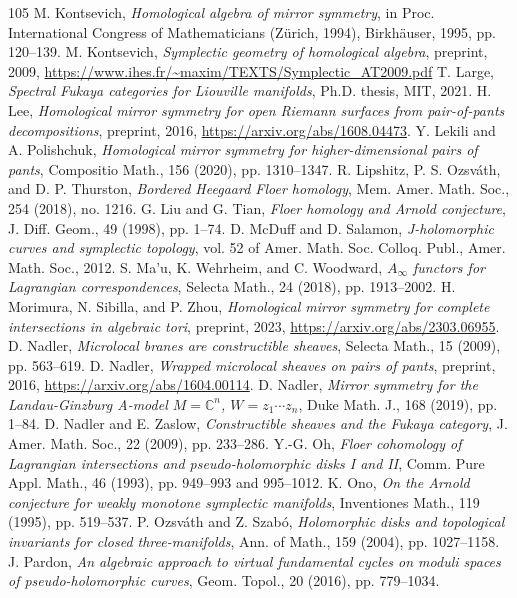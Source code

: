 \documentclass[UTF8,a4paper,11pt,fontset=windows]{ctexart}
\theoremstyle{cnthm}
\numberwithin{equation}{section}
\begin{document}
\begin{thebibliography}{105}
 M. Kontsevich, \emph{Homological algebra of mirror symmetry}, in Proc. International Congress of Mathematicians (Z\"urich, 1994), Birkh\"auser, 1995, pp. 120--139.
 M. Kontsevich, \emph{Symplectic geometry of homological algebra}, preprint, 2009, \url{https://www.ihes.fr/~maxim/TEXTS/Symplectic_AT2009.pdf}
 T. Large, \emph{Spectral Fukaya categories for Liouville manifolds}, Ph.D. thesis, MIT, 2021.
 H. Lee, \emph{Homological mirror symmetry for open Riemann surfaces from pair-of-pants decompositions}, preprint, 2016, \url{https://arxiv.org/abs/1608.04473}.
 Y. Lekili and A. Polishchuk, \emph{Homological mirror symmetry for higher-dimensional pairs of pants}, Compositio Math., 156 (2020), pp. 1310--1347.
 R. Lipshitz, P. S. Ozsv\'ath, and D. P. Thurston, \emph{Bordered Heegaard Floer homology}, Mem. Amer. Math. Soc., 254 (2018), no. 1216.
 G. Liu and G. Tian, \emph{Floer homology and Arnold conjecture}, J. Diff. Geom., 49 (1998), pp. 1--74.
 D. McDuff and D. Salamon, \emph{J-holomorphic curves and symplectic topology}, vol. 52 of Amer. Math. Soc. Colloq. Publ., Amer. Math. Soc., 2012.
 S. Ma'u, K. Wehrheim, and C. Woodward, \emph{$A_\infty$ functors for Lagrangian correspondences}, Selecta Math., 24 (2018), pp. 1913--2002.
 H. Morimura, N. Sibilla, and P. Zhou, \emph{Homological mirror symmetry for complete intersections in algebraic tori}, preprint, 2023, \url{https://arxiv.org/abs/2303.06955}.
 D. Nadler, \emph{Microlocal branes are constructible sheaves}, Selecta Math., 15 (2009), pp. 563--619.
 D. Nadler, \emph{Wrapped microlocal sheaves on pairs of pants}, preprint, 2016, \url{https://arxiv.org/abs/1604.00114}.
 D. Nadler, \emph{Mirror symmetry for the Landau-Ginzburg A-model $M = \mathbb{C}^n$, $W = z_1\cdots z_n$}, Duke Math. J., 168 (2019), pp. 1--84.
 D. Nadler and E. Zaslow, \emph{Constructible sheaves and the Fukaya category}, J. Amer. Math. Soc., 22 (2009), pp. 233--286.
 Y.-G. Oh, \emph{Floer cohomology of Lagrangian intersections and pseudo-holomorphic disks I and II}, Comm. Pure Appl. Math., 46 (1993), pp. 949--993 and 995--1012.
 K. Ono, \emph{On the Arnold conjecture for weakly monotone symplectic manifolds}, Inventiones Math., 119 (1995), pp. 519--537.
 P. Ozsv\'ath and Z. Szab\'o, \emph{Holomorphic disks and topological invariants for closed three-manifolds}, Ann. of Math., 159 (2004), pp. 1027--1158.
 J. Pardon, \emph{An algebraic approach to virtual fundamental cycles on moduli spaces of pseudo-holomorphic curves}, Geom. Topol., 20 (2016), pp. 779--1034.

\end{thebibliography}
\end{document}
